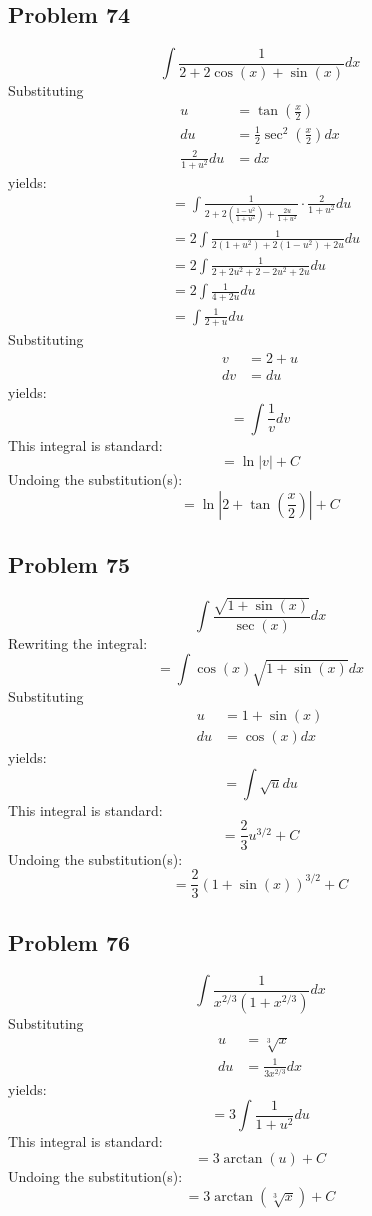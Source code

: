 \documentclass{article}
\begin{document}
\subsection*{Problem 74}
$$\int\frac{1}{2+2\cos\left(x\right)+\sin\left(x\right)}dx$$
Substituting
\begin{align*}
u&=\tan\left(\frac{x}{2}\right) \\
du&=\frac{1}{2}\sec^2\left(\frac{x}{2}\right)dx \\
\frac{2}{1+u^2}du&=dx
\end{align*}
yields:
\begin{align*}
&=\int\frac{1}{2+2\left(\frac{1-u^2}{1+u^2}\right)+\frac{2u}{1+u^2}}\cdot\frac{2}{1+u^2}du \\
&=2\int\frac{1}{2(1+u^2)+2(1-u^2)+2u}du \\
&=2\int\frac{1}{2+2u^2+2-2u^2+2u}du \\
&=2\int\frac{1}{4+2u}du \\
&=\int\frac{1}{2+u}du
\end{align*}
Substituting
\begin{align*}
v&=2+u \\
dv&=du
\end{align*}
yields:
$$=\int\frac{1}{v}dv$$
This integral is standard:
$$=\ln|v|+C$$
Undoing the substitution(s):
$$=\ln\left|2+\tan\left(\frac{x}{2}\right)\right|+C$$
\subsection*{Problem 75}
$$\int\frac{\sqrt{1+\sin\left(x\right)}}{\sec\left(x\right)}dx$$
Rewriting the integral:
$$=\int\cos(x)\sqrt{1+\sin(x)}dx$$
Substituting
\begin{align*}
u&=1+\sin(x) \\
du&=\cos(x)dx
\end{align*}
yields:
$$=\int\sqrt{u}du$$
This integral is standard:
$$=\frac{2}{3}u^{3/2}+C$$
Undoing the substitution(s):
$$=\frac{2}{3}(1+\sin(x))^{3/2}+C$$
\subsection*{Problem 76}
$$\int\frac{1}{x^{2/3}\left(1+x^{2/3}\right)}dx$$
Substituting
\begin{align*}
u&=\sqrt[3]{x} \\
du&=\frac{1}{3x^{2/3}}dx
\end{align*}
yields:
$$=3\int\frac{1}{1+u^2}du$$
This integral is standard:
$$=3\arctan(u)+C$$
Undoing the substitution(s):
$$=3\arctan\left(\sqrt[3]{x}\right)+C$$
\end{document}
